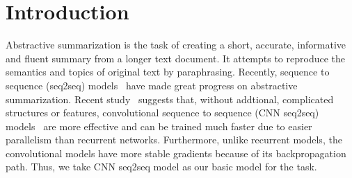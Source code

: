 \section{Introduction}
\label{sec:intro}

Abstractive summarization is the task of creating a short, accurate,
informative and fluent summary from a longer text document.
It attempts to reproduce the semantics and topics of original text
by paraphrasing. 
Recently, sequence to sequence (seq2seq)
models~\cite{RushCW15,ChopraAR16,NallapatiZSGX16,SeeLM17,PaulusXS17}
have made great progress on abstractive summarization.
Recent study~\cite{bai2018empirical} suggests that, 
without addtional, complicated structures or features,
convolutional sequence to sequence 
(CNN seq2seq) models~\cite{gehring2017convs2s,FanGA18,LiuLZ18} 
are more effective and can be trained much faster due to 
easier parallelism than recurrent networks.
Furthermore, unlike recurrent models, 
the convolutional models have more stable gradients 
because of its backpropagation path. 
Thus, we take CNN seq2seq model as our basic model for the task.

